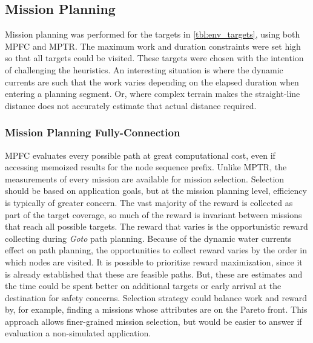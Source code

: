 \documentclass{tamuccthesis}
\begin{document}
\subsection{Mission Planning}

Mission planning was performed for the targets in \ref{tbl:env_targets}, using both MPFC and MPTR. The maximum work and duration constraints were set high so that all targets could be visited. These targets were chosen with the intention of challenging the heuristics. An interesting situation is where the dynamic currents are such that the work varies depending on the elapsed duration when entering a planning segment. Or, where complex terrain makes the straight-line distance does not accurately estimate that actual distance required. 


\subsubsection{Mission Planning Fully-Connection}

MPFC evaluates every  possible path at great computational cost, even if accessing memoized results for the node sequence prefix. Unlike MPTR, the measurements of every mission are available for mission selection. Selection should be based on application goals, but at the mission planning level, efficiency is typically of greater concern. The vast majority of the reward is collected as part of the target coverage, so much of the reward is invariant between missions that reach all possible targets. The reward that varies is the opportunistic reward collecting during \textit{Goto} path planning. Because of the dynamic water currents effect on path planning, the opportunities to collect reward varies by the order in which nodes are visited. It is possible to prioritize reward maximization, since it is already established that these are feasible paths. But, these are estimates and the time could be spent better on additional targets or early arrival at the destination for safety concerns. Selection strategy could balance work and reward by, for example, finding a missions whose attributes are on the Pareto front. This approach allows finer-grained mission selection, but would be easier to answer if evaluation a non-simulated application. 
\end{document}
